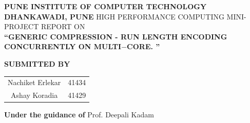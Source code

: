 \documentclass[a4paper, 12pt]{article}
\begin{document}
 
\begin{titlepage}
    \begin{center}
        \vspace*{1cm}
        
        \large
                \textbf{\MakeUppercase{Pune Institute of Computer Technology}}
                \linebreak
        \textbf{\MakeUppercase{Dhankawadi, Pune}}
        \vspace{0.5cm}
                        \linebreak
                        \linebreak
        \MakeUppercase{High Performance Computing Mini-Project REPORT }
        \linebreak
        ON
        \linebreak
        \vspace{0.5cm}
        \large
        \\
        \textbf{\MakeUppercase{“Generic Compression - Run length encoding
concurrently on multi$-$core. ”}}
        \linebreak
        
        \textbf{SUBMITTED BY}
        \vspace{1cm}
        
        \begin{center}
        \begin{tabular}{ c c }
         Nachiket Erlekar & 41434 \\ 
         Ashay Koradia & 41429 
        \end{tabular}
        \end{center}
                
        \textbf{\large{Under the guidance of}}
        \linebreak
        Prof. Deepali Kadam
        \linebreak
        
        
        
        \vspace{0.8cm}
        


\end{center}
\end{titlepage}
\end{document}
